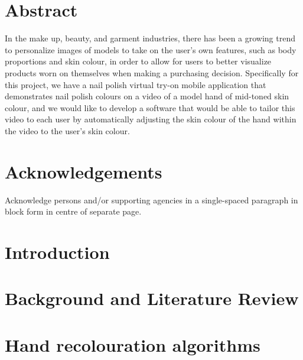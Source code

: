 \documentclass[12pt, a4paper]{article}
\begin{document}


\renewcommand{\thepage}{\roman{page}}%
\setcounter{page}{1}

\section*{Abstract}
In the make up, beauty, and garment industries, there has been a growing trend to personalize images of models to take on the user’s own features, such as body proportions and skin colour, in order to allow for users to better visualize products worn on themselves when making a purchasing decision. Specifically for this project, we have a nail polish virtual try-on mobile application that demonstrates nail polish colours on a video of a model hand of mid-toned skin colour, and we would like to develop a software that would be able to tailor this video to each user by automatically adjusting the skin colour of the hand within the video to the user’s skin colour. 

\pagebreak

\section*{Acknowledgements}
Acknowledge persons and/or supporting agencies in a single-spaced paragraph in block form in centre of separate page.
\pagebreak

\tableofcontents
\pagebreak

\listoffigures
\listoftables
\pagebreak

\renewcommand{\nomname}{List of Symbols}
\printnomenclature
\pagebreak

\renewcommand{\thepage}{\arabic{page}}%
\setcounter{page}{1}

\section{Introduction}

\pagebreak

\section{Background and Literature Review}

\pagebreak

\section{Hand recolouration algorithms}

\pagebreak
\end{document}
